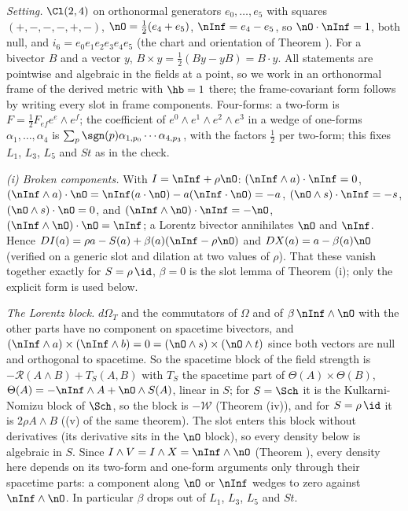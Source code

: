\emph{Setting.} $\Cl(2,4)$ on orthonormal generators $e_{0}, \dots, e_{5}$ with squares $(+,-,-,-,+,-)$, $\nO = \tfrac12(e_{4} + e_{5})$, $\nInf = e_{4} - e_{5}$, so $\nO \cdot \nInf = 1$, both null, and $i_{6} = e_{0}e_{1}e_{2}e_{3}e_{4}e_{5}$ (the chart and orientation of Theorem ). For a bivector $B$ and a vector $y$, $B \times y = \tfrac12(By - yB) = B \cdot y$. All statements are pointwise and algebraic in the fields at a point, so we work in an orthonormal frame of the derived metric with $\hb = 1$ there; the frame-covariant form follows by writing every slot in frame components. Four-forms: a two-form is $F = \tfrac12 F_{ef}e^{e} \wedge e^{f}$; the coefficient of $e^{0} \wedge e^{1} \wedge e^{2} \wedge e^{3}$ in a wedge of one-forms $\alpha_{1}, \dots, \alpha_{4}$ is $\sum_{p}\sgn(p)\alpha_{1,p_{0}}\cdots\alpha_{4,p_{3}}$, with the factors $\tfrac12$ per two-form; this fixes $L_{1}$, $L_{3}$, $L_{5}$ and $St$ as in the check.

\emph{(i) Broken components.} With $I = \nInf + \rho\nO$: $(\nInf \wedge a)\cdot\nInf = 0$, $(\nInf \wedge a)\cdot\nO = \nInf(a \cdot \nO) - a(\nInf \cdot \nO) = -a$, $(\nO \wedge s)\cdot\nInf = -s$, $(\nO \wedge s)\cdot\nO = 0$, and $(\nInf \wedge \nO)\cdot\nInf = -\nO$, $(\nInf \wedge \nO)\cdot\nO = \nInf$; a Lorentz bivector annihilates $\nO$ and $\nInf$. Hence $DI(a) = \rho a - S(a) + \beta(a)(\nInf - \rho\nO)$ and $DX(a) = a - \beta(a)\nO$ (verified on a generic slot and dilation at two values of $\rho$). That these vanish together exactly for $S = \rho\,\id$, $\beta = 0$ is the slot lemma of Theorem (i); only the explicit form is used below.

\emph{The Lorentz block.} $d\Omega_{T}$ and the commutators of $\Omega$ and of $\beta\,\nInf \wedge \nO$ with the other parts have no component on spacetime bivectors, and $(\nInf \wedge a) \times (\nInf \wedge b) = 0 = (\nO \wedge s) \times (\nO \wedge t)$ since both vectors are null and orthogonal to spacetime. So the spacetime block of the field strength is $-\mathcal{R}(A \wedge B) + T_{S}(A, B)$ with $T_{S}$ the spacetime part of $\Theta(A) \times \Theta(B)$, $\Theta(A) = -\nInf \wedge A + \nO \wedge S(A)$, linear in $S$; for $S = \Sch$ it is the Kulkarni-Nomizu block of $\Sch$, so the block is $-\mathcal{W}$ (Theorem (iv)), and for $S = \rho\,\id$ it is $2\rho A \wedge B$ ((v) of the same theorem). The slot enters this block without derivatives (its derivative sits in the $\nO$ block), so every density below is algebraic in $S$. Since $I \wedge V = I \wedge X = \nInf \wedge \nO$ (Theorem ), every density here depends on its two-form and one-form arguments only through their spacetime parts: a component along $\nO$ or $\nInf$ wedges to zero against $\nInf \wedge \nO$. In particular $\beta$ drops out of $L_{1}$, $L_{3}$, $L_{5}$ and $St$.

